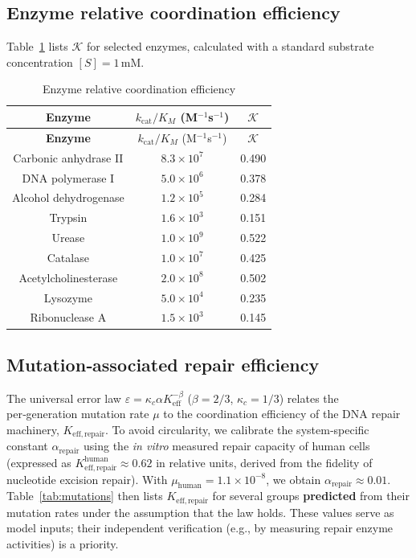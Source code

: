\documentclass[12pt,a4paper]{article}
\newcommand{\REL}{\mathcal{K}}          %
\begin{document}
	\subsection{Enzyme relative coordination efficiency}
	\label{sec:enzymes}
	Table~\ref{tab:enzymes} lists \(\REL\) for selected enzymes, calculated with a standard substrate concentration \([S]=1\,\text{mM}\).
	
	\begin{longtable}{|c|c|c|}
		\caption{Enzyme relative coordination efficiency}\label{tab:enzymes}\\
		\hline
		\textbf{Enzyme} & \(k_{\mathrm{cat}}/K_M\) (M\(^{-1}\)s\(^{-1}\)) & \(\REL\) \\
		\hline
		\endfirsthead
		\hline
		\textbf{Enzyme} & \(k_{\mathrm{cat}}/K_M\) (M\(^{-1}\)s\(^{-1}\)) & \(\REL\) \\
		\hline
		\endhead
		\hline
		Carbonic anhydrase II & \(8.3\times10^7\) & 0.490 \\
		DNA polymerase I & \(5.0\times10^6\) & 0.378 \\
		Alcohol dehydrogenase & \(1.2\times10^5\) & 0.284 \\
		Trypsin & \(1.6\times10^3\) & 0.151 \\
		Urease & \(1.0\times10^9\) & 0.522 \\
		Catalase & \(1.0\times10^7\) & 0.425 \\
		Acetylcholinesterase & \(2.0\times10^8\) & 0.502 \\
		Lysozyme & \(5.0\times10^4\) & 0.235 \\
		Ribonuclease A & \(1.5\times10^3\) & 0.145 \\
		\hline
	\end{longtable}
	
	\subsection{Mutation‑associated repair efficiency}
	\label{sec:mutations}
	The universal error law \(\varepsilon = \kappa_c \alpha K_{\mathrm{eff}}^{-\beta}\) (\(\beta=2/3\), \(\kappa_c=1/3\)) relates the per‑generation mutation rate \(\mu\) to the coordination efficiency of the DNA repair machinery, \(K_{\mathrm{eff,repair}}\). To avoid circularity, we calibrate the system‑specific constant \(\alpha_{\mathrm{repair}}\) using the \textit{in vitro} measured repair capacity of human cells (expressed as \(K_{\mathrm{eff,repair}}^{\mathrm{human}} \approx 0.62\) in relative units, derived from the fidelity of nucleotide excision repair). With \(\mu_{\mathrm{human}}=1.1\times10^{-8}\), we obtain \(\alpha_{\mathrm{repair}} \approx 0.01\). Table~\ref{tab:mutations} then lists \(K_{\mathrm{eff,repair}}\) for several groups \textbf{predicted} from their mutation rates under the assumption that the law holds. These values serve as model inputs; their independent verification (e.g., by measuring repair enzyme activities) is a priority.
	
\end{document}
